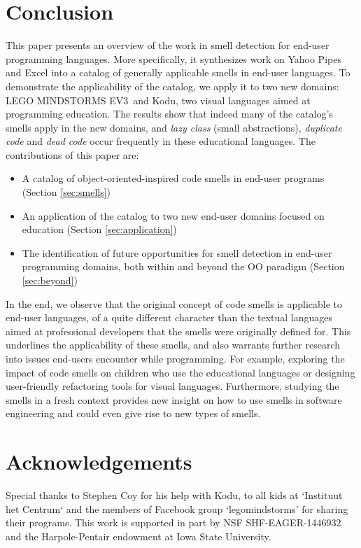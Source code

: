 \documentclass{sig-alternate}
\newcommand{\ms}{LEGO MINDSTORMS EV3}
\begin{document}
\section{Conclusion}
\label{sec:conclusions}
This paper presents an overview of the work in smell detection for end-user programming languages. More specifically, it synthesizes work on Yahoo Pipes and Excel into a catalog of generally applicable smells in end-user languages. To demonstrate the applicability of the catalog, we apply it to two new domains: \ms~and Kodu, two visual languages aimed at programming education. The results show that indeed many of the catalog's smells apply in the new domains, and \emph{lazy class} (small abstractions), \emph{duplicate code} and \emph{dead code} occur frequently in these educational languages. The contributions of this paper are:

\begin{itemize}
	\item A catalog of object-oriented-inspired code smells in end-user programs (Section \ref{sec:smells})
	\item An application of the catalog to two new end-user domains focused on education (Section \ref{sec:application})
	\item The identification of future opportunities for smell detection in end-user programming domains, both within and beyond the OO paradigm (Section \ref{sec:beyond})
\end{itemize}

In the end, we observe that the original concept of code smells is applicable to end-user languages, of a quite different character than the textual languages aimed at professional developers that the smells were originally defined for. This underlines the applicability of these smells, and also warrants further research into issues end-users encounter while programming. For example, exploring the impact of code smells on children who use the educational languages or designing user-friendly refactoring tools for visual languages. 
Furthermore, studying the smells in a fresh context provides new insight on how to use smells in software engineering and could even give rise to new types of smells. 

\balance

\section*{Acknowledgements}
Special thanks to Stephen Coy for his help with Kodu, to all kids at `Instituut het Centrum` and the members of Facebook group `legomindstorms' for sharing their programs. This work is supported in part by  NSF SHF-EAGER-1446932 and the Harpole-Pentair endowment at Iowa State University.




\end{document}
